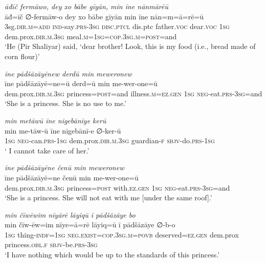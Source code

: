 \ea \label{ZP.101}
\textit{āđīč fermāwo, dey xo bābe gīyān, min īne nānmārēū} \\ 
\gll āđ=īč ∅-fermāw-o dey xo bābe gīyān min īne nān=m=ā=rē=ū \\ 
 3sg\textsc{.dir}\textsc{.m}\textsc{=add} \textsc{ind-}say\textsc{.prs}\textsc{-3sg} \textsc{disc.ptcl} dis.ptc father.\textsc{voc} dear.\textsc{voc} \textsc{1sg} dem.prox\textsc{.dir}\textsc{.m}\textsc{.3sg} meal\textsc{.m}\textsc{=\textsc{1sg}}\textsc{=cop}\textsc{.3sg}\textsc{.m}\textsc{=\textsc{post}}=and \\ 
\glt `He (Pir Shaliyar) said, ‘dear brother! Look, this is my food (i.e., bread made of corn flour)'
\z 
 
\ea \label{ZP.102}
\textit{īne pādšāzāyēnew derdū min meweronew} \\ 
\gll īne pādšāzāyē=ne=ū derd=ū min me-wer-one=ū \\ 
 dem.prox\textsc{.dir}\textsc{.m}\textsc{.3sg} princess\textsc{=\textsc{post}}=and illness\textsc{.m}\textsc{\textsc{=ez.gen}} \textsc{1sg} \textsc{neg-}eat\textsc{.prs}\textsc{-3sg}=and \\ 
\glt `She is a princess. She is no use to me.'
\z 
 
\ea \label{ZP.103}
\textit{min metāwū īne nigebānīye kerū} \\ 
\gll min me-tāw-ū īne nigebānī-e ∅-ker-ū \\ 
 \textsc{1sg} \textsc{neg-}can\textsc{.prs}\textsc{-\textsc{1sg}} dem.prox\textsc{.dir}\textsc{.m}\textsc{.3sg} guardian\textsc{-f} \textsc{sbjv-}do\textsc{.prs}\textsc{-\textsc{1sg}} \\ 
\glt ` I cannot take care of her.'
\z 
 
\ea \label{ZP.104}
\textit{īne pādšāzāyēne čenū min meweronew} \\ 
\gll īne pādšāzāyē=ne čenū min me-wer-one=ū \\ 
 dem.prox\textsc{.dir}\textsc{.m}\textsc{.3sg} princess\textsc{=\textsc{post}} with\textsc{.ez.gen} \textsc{1sg} \textsc{neg-}eat\textsc{.prs}\textsc{-3sg}=and \\ 
\glt `She is a princess. She will not eat with me [under the same roof].'
\z 
 
\ea \label{ZP.105}
\textit{min čīwēwim nīyārē lāyiqū ī pādšāzāye bo} \\ 
\gll min čīw-ēw=im nīye=ā=rē lāyiq=ū ī pādšāzāye ∅-b-o \\ 
 \textsc{1sg} thing\textsc{-indf}\textsc{=\textsc{1sg}} \textsc{\textsc{neg.}exist}\textsc{=cop}\textsc{.3sg}\textsc{.m}\textsc{=\textsc{povb}} deserved\textsc{\textsc{=ez.gen}} dem.prox princess\textsc{.obl}\textsc{.f} \textsc{sbjv-}be\textsc{.prs}\textsc{-3sg} \\ 
\glt `I have nothing which would be up to the standards of this princess.'
\z 
 

